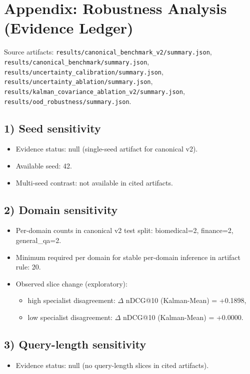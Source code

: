 \section*{Appendix: Robustness Analysis (Evidence Ledger)}

\noindent Source artifacts: \texttt{results/canonical\_benchmark\_v2/summary.json},
\texttt{results/canonical\_benchmark/summary.json},
\texttt{results/uncertainty\_calibration/summary.json},
\texttt{results/uncertainty\_ablation/summary.json},
\texttt{results/kalman\_covariance\_ablation\_v2/summary.json},
\texttt{results/ood\_robustness/summary.json}.

\subsection*{1) Seed sensitivity}
\begin{itemize}
  \item Evidence status: null (single-seed artifact for canonical v2).
  \item Available seed: 42.
  \item Multi-seed contrast: not available in cited artifacts.
\end{itemize}

\subsection*{2) Domain sensitivity}
\begin{itemize}
  \item Per-domain counts in canonical v2 test split: biomedical=2, finance=2, general\_qa=2.
  \item Minimum required per domain for stable per-domain inference in artifact rule: 20.
  \item Observed slice change (exploratory):
    \begin{itemize}
      \item high specialist disagreement: $\Delta$ nDCG@10 (Kalman-Mean) = +0.1898,
      \item low specialist disagreement: $\Delta$ nDCG@10 (Kalman-Mean) = +0.0000.
    \end{itemize}
\end{itemize}

\subsection*{3) Query-length sensitivity}
\begin{itemize}
  \item Evidence status: null (no query-length slices in cited artifacts).
\end{itemize}

